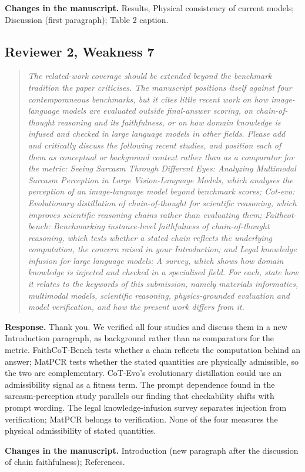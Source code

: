 \documentclass[11pt,a4paper]{article}
\newenvironment{reviewer}{\begin{quote}\itshape\small}{\end{quote}}
\begin{document}
\textbf{Changes in the manuscript.} Results, Physical consistency of current models; Discussion (first paragraph); Table 2 caption.

\subsection*{Reviewer 2, Weakness 7}

\begin{reviewer}The related-work coverage should be extended beyond the benchmark tradition the paper criticises. The manuscript positions itself against four contemporaneous benchmarks, but it cites little recent work on how image-language models are evaluated outside final-answer scoring, on chain-of-thought reasoning and its faithfulness, or on how domain knowledge is infused and checked in large language models in other fields. Please add and critically discuss the following recent studies, and position each of them as conceptual or background context rather than as a comparator for the metric: Seeing Sarcasm Through Different Eyes: Analyzing Multimodal Sarcasm Perception in Large Vision-Language Models, which analyses the perception of an image-language model beyond benchmark scores; Cot-evo: Evolutionary distillation of chain-of-thought for scientific reasoning, which improves scientific reasoning chains rather than evaluating them; Faithcot-bench: Benchmarking instance-level faithfulness of chain-of-thought reasoning, which tests whether a stated chain reflects the underlying computation, the concern raised in your Introduction; and Legal knowledge infusion for large language models: A survey, which shows how domain knowledge is injected and checked in a specialised field. For each, state how it relates to the keywords of this submission, namely materials informatics, multimodal models, scientific reasoning, physics-grounded evaluation and model verification, and how the present work differs from it.\end{reviewer}

\textbf{Response.} Thank you. We verified all four studies and discuss them in a new Introduction paragraph, as background rather than as comparators for the metric. FaithCoT-Bench tests whether a chain reflects the computation behind an answer; MatPCR tests whether the stated quantities are physically admissible, so the two are complementary. CoT-Evo's evolutionary distillation could use an admissibility signal as a fitness term. The prompt dependence found in the sarcasm-perception study parallels our finding that checkability shifts with prompt wording. The legal knowledge-infusion survey separates injection from verification; MatPCR belongs to verification. None of the four measures the physical admissibility of stated quantities.

\textbf{Changes in the manuscript.} Introduction (new paragraph after the discussion of chain faithfulness); References.
\end{document}
